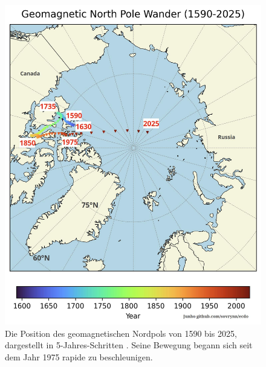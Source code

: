 \documentclass[10pt,twocolumn,letterpaper]{article}
\begin{document}
\begin{figure}[t]
\begin{center}
   \includegraphics[width=1\linewidth]{npw.jpg}
\end{center}
   \caption{Die Position des geomagnetischen Nordpols von 1590 bis 2025, dargestellt in 5-Jahres-Schritten \cite{41}. Seine Bewegung begann sich seit dem Jahr 1975 rapide zu beschleunigen.}
\label{fig:13}
\label{fig:onecol}
\end{figure}
\end{document}
